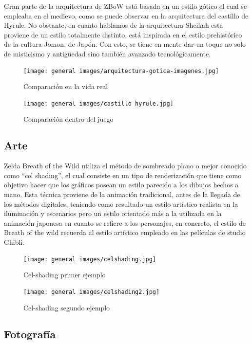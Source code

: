 \documentclass[12pt]{article}
\begin{document}
Gran parte de la arquitectura de ZBoW está basada en un estilo gótico el cual se empleaba en el medievo, como se puede observar en la arquitectura del castillo de Hyrule. No obstante, en cuanto hablamos de la arquitectura Sheikah esta proviene de un estilo totalmente distinto, está inspirada en el estilo prehistórico de la cultura Jomon, de Japón. Con esto, se tiene en mente dar un toque no solo de misticismo y antigüedad sino también avanzado tecnológicamente.

    \begin{figure}[H]
      \centering
      \texttt{[image: general images/arquitectura-gotica-imagenes.jpg]}
      \caption{\small Comparación en la vida real}
    \end{figure}

        \begin{figure}[H]
      \centering
      \texttt{[image: general images/castillo hyrule.jpg]}
      \caption{\small Comparación dentro del juego}
    \end{figure}


\subsection{Arte}

Zelda Breath of the Wild utiliza el método de sombreado plano o mejor conocido como “cel shading”, el cual consiste en un tipo de renderización que tiene como objetivo hacer que los gráficos posean un estilo parecido a los dibujos hechos a mano. Esta técnica proviene de la animación tradicional, antes de la llegada de los métodos digitales, teniendo como resultado un estilo artístico realista en la iluminación y escenarios pero un estilo orientado más a la utilizada en la animación japonesa en cuanto se refiere a los personajes, en concreto, el estilo de Breath of the wild recuerda al estilo artístico empleado en las películas de studio Ghibli.

    \begin{figure}[H]
      \centering
      \texttt{[image: general images/celshading.jpg]}
      \caption{\small Cel-shading primer ejemplo}
    \end{figure}

        \begin{figure}[H]
      \centering
      \texttt{[image: general images/celshading2.jpg]}
      \caption{\small Cel-shading segundo ejemplo}
    \end{figure}

\subsection{Fotografía}
\end{document}
